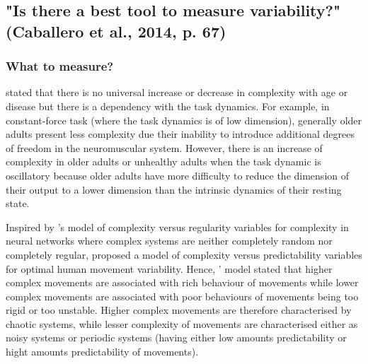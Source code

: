 \subsection{"Is there a best tool to measure variability?" (Caballero et al., 2014, p. 67)  }

\subsubsection{What to measure?}

\cite{vaillancourt2002, vaillancourt2003} stated that 
there is no universal increase or decrease in complexity with age or disease
but there is a dependency with the task dynamics.
For example, in constant-force task (where the task dynamics is of low dimension),
generally older adults present less complexity due their inability to introduce 
additional degrees of freedom in the neuromuscular system.
However, there is an increase of complexity in older adults or unhealthy adults 
when the task dynamic is oscillatory because older adults have 
more difficulty to reduce the dimension of their output to a lower dimension
than the intrinsic dynamics of their resting state.

Inspired by \cite{tononi1998}'s model of complexity versus regularity variables
for complexity in neural networks where complex systems are neither completely random nor completely regular,
\cite{stergiou2006} proposed a model of complexity versus predictability variables 
for optimal human movement variability.
Hence, \cite{stergiou2006}' model stated that higher complex movements are 
associated with rich behaviour of movements while lower complex movements 
are associated with poor behaviours of movements being too rigid or too unstable.
Higher complex movements are therefore characterised by chaotic systems, 
while lesser complexity of movements are characterised either 
as noisy systems or periodic systems (having either low amounts predictability 
or hight amounts predictability of movements).




